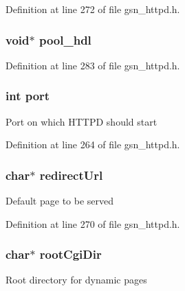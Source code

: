 Definition at line 272 of file gsn\_\-httpd.h.

\hypertarget{a00095_aa151e2a38086b90e2c33abce22b78e84}{
\subsubsection[{pool\_\-hdl}]{\setlength{\rightskip}{0pt plus 5cm}void$\ast$ {\bf pool\_\-hdl}}}
\label{a00095_aa151e2a38086b90e2c33abce22b78e84}


Definition at line 283 of file gsn\_\-httpd.h.

\hypertarget{a00095_a63c89c04d1feae07ca35558055155ffb}{
\subsubsection[{port}]{\setlength{\rightskip}{0pt plus 5cm}int {\bf port}}}
\label{a00095_a63c89c04d1feae07ca35558055155ffb}
Port on which HTTPD should start 

Definition at line 264 of file gsn\_\-httpd.h.

\hypertarget{a00095_ad3e53ed21d0e77f5b0af7f29c292919a}{
\subsubsection[{redirectUrl}]{\setlength{\rightskip}{0pt plus 5cm}char$\ast$ {\bf redirectUrl}}}
\label{a00095_ad3e53ed21d0e77f5b0af7f29c292919a}
Default page to be served 

Definition at line 270 of file gsn\_\-httpd.h.

\hypertarget{a00095_a04f54a405b478d792ae115e74c6236b4}{
\subsubsection[{rootCgiDir}]{\setlength{\rightskip}{0pt plus 5cm}char$\ast$ {\bf rootCgiDir}}}
\label{a00095_a04f54a405b478d792ae115e74c6236b4}
Root directory for dynamic pages 

